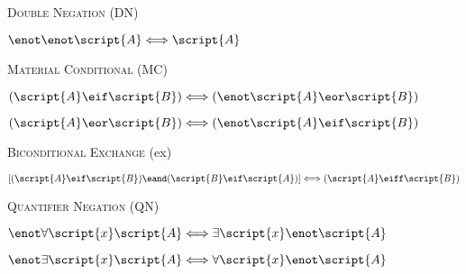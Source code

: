 \begin{multicols}{2}
\noindent\textsc{Double Negation} (DN)
\begin{earg}
\item[] $\enot\enot\script{A} \Longleftrightarrow \script{A}$
\end{earg}

\noindent\textsc{Material Conditional} (MC)
\begin{earg}
\item[] $(\script{A}\eif\script{B}) \Longleftrightarrow (\enot\script{A}\eor\script{B})$\\
\item[] $(\script{A}\eor\script{B}) \Longleftrightarrow (\enot\script{A}\eif\script{B})$
\end{earg}

\noindent\textsc{Biconditional Exchange} ({\eiff}{ex})\\
\begin{earg}
\item[] $[(\script{A}\eif\script{B})\eand(\script{B}\eif\script{A})] \Longleftrightarrow (\script{A}\eiff\script{B})$
\end{earg}

\noindent\textsc{Quantifier Negation} (QN)\\
\begin{earg}
\item[] $\enot\forall\script{x}\script{A} \Longleftrightarrow \exists\script{x}\enot\script{A}$\\
\item[] $\enot\exists\script{x}\script{A} \Longleftrightarrow \forall\script{x}\enot\script{A}$
\end{earg}

\end{multicols}

